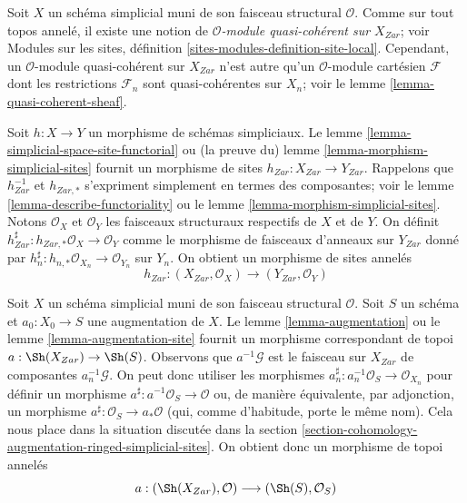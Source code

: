 \medskip\noindent
Soit $X$ un schéma simplicial muni de son faisceau structural $\mathcal{O}$.
Comme sur tout topos annelé, il existe une notion
de {\it $\mathcal{O}$-module quasi-cohérent sur $X_{Zar}$}; voir Modules
sur les sites, définition \ref{sites-modules-definition-site-local}.
Cependant, un $\mathcal{O}$-module quasi-cohérent sur $X_{Zar}$ n'est
autre qu'un $\mathcal{O}$-module cartésien $\mathcal{F}$ dont les restrictions
$\mathcal{F}_n$ sont quasi-cohérentes sur $X_n$; voir le
lemme \ref{lemma-quasi-coherent-sheaf}.

\medskip\noindent
Soit $h : X \to Y$ un morphisme de schémas simpliciaux. Le
lemme \ref{lemma-simplicial-space-site-functorial} ou
(la preuve du) lemme \ref{lemma-morphism-simplicial-sites}
fournit un morphisme de sites $h_{Zar} : X_{Zar} \to Y_{Zar}$.
Rappelons que $h_{Zar}^{-1}$ et $h_{Zar, *}$ s'expriment simplement
en termes des composantes; voir le lemme
\ref{lemma-describe-functoriality} ou le lemme
\ref{lemma-morphism-simplicial-sites}.
Notons $\mathcal{O}_X$ et $\mathcal{O}_Y$ les faisceaux structuraux
respectifs de $X$ et de $Y$. On définit
$h_{Zar}^\sharp : h_{Zar, *}\mathcal{O}_X \to \mathcal{O}_Y$
comme le morphisme de faisceaux d'anneaux sur $Y_{Zar}$ donné par
$h_n^\sharp : h_{n, *}\mathcal{O}_{X_n} \to \mathcal{O}_{Y_n}$ sur $Y_n$.
On obtient un morphisme de sites annelés
$$
h_{Zar} : (X_{Zar}, \mathcal{O}_X) \longrightarrow (Y_{Zar}, \mathcal{O}_Y)
$$

\medskip\noindent
Soit $X$ un schéma simplicial muni de son faisceau structural $\mathcal{O}$.
Soit $S$ un schéma et $a_0 : X_0 \to S$ une augmentation de $X$.
Le
lemme \ref{lemma-augmentation} ou le
lemme \ref{lemma-augmentation-site}
fournit un morphisme correspondant de topoi $a : \Sh(X_{Zar}) \to \Sh(S)$.
Observons que $a^{-1}\mathcal{G}$ est le faisceau sur $X_{Zar}$ de composantes
$a_n^{-1}\mathcal{G}$. On peut donc utiliser les morphismes
$a_n^\sharp : a_n^{-1}\mathcal{O}_S \to \mathcal{O}_{X_n}$ pour définir
un morphisme $a^\sharp : a^{-1}\mathcal{O}_S \to \mathcal{O}$ ou, de manière équivalente,
par adjonction, un morphisme $a^\sharp : \mathcal{O}_S \to a_*\mathcal{O}$
(qui, comme d'habitude, porte le même nom). Cela nous place dans la situation
discutée dans la section
\ref{section-cohomology-augmentation-ringed-simplicial-sites}.
On obtient donc un morphisme de topoi annelés
$$
a : (\Sh(X_{Zar}), \mathcal{O}) \longrightarrow (\Sh(S), \mathcal{O}_S)
$$

